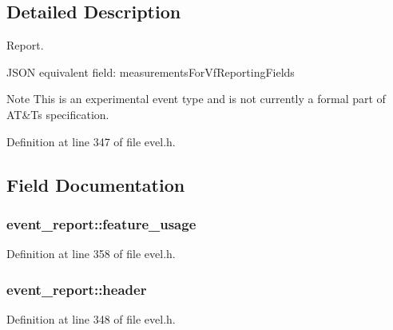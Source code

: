\subsection{Detailed Description}
Report. 

J\+S\+O\+N equivalent field\+: measurements\+For\+Vf\+Reporting\+Fields

\begin{DoxyNote}{Note}
This is an experimental event type and is not currently a formal part of A\+T\&T\textquotesingle{}s specification. 
\end{DoxyNote}


Definition at line 347 of file evel.\+h.



\subsection{Field Documentation}
\hypertarget{structevent__report_abb6a555e0bf695531258a22286826cc2}{}
\subsubsection[{feature\+\_\+usage}]{ event\+\_\+report\+::feature\+\_\+usage}\label{structevent__report_abb6a555e0bf695531258a22286826cc2}


Definition at line 358 of file evel.\+h.

\hypertarget{structevent__report_a7f9683ffdfa96c3c82913f7f60e95abb}{}
\subsubsection[{header}]{ event\+\_\+report\+::header}\label{structevent__report_a7f9683ffdfa96c3c82913f7f60e95abb}


Definition at line 348 of file evel.\+h.

\hypertarget{structevent__report_abeb856adaab0580ff115ed65dd8839a9}{}

